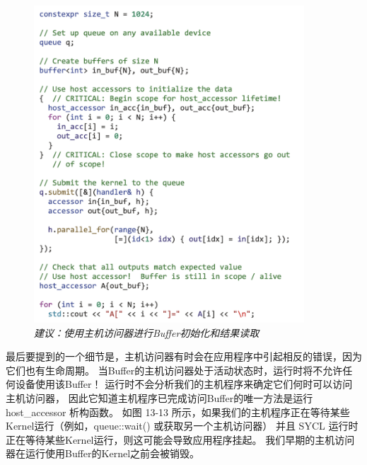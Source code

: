 \begin{figure}[H]
	\centering
	\includegraphics[width=0.9\textwidth]{figs/F13.12.png}
	\caption{\textit{建议：使用主机访问器进行Buffer初始化和结果读取 }}
\end{figure}

最后要提到的一个细节是，主机访问器有时会在应用程序中引起相反的错误，因为它们也有生命周期。 
当Buffer的主机访问器处于活动状态时，运行时将不允许任何设备使用该Buffer！ 
运行时不会分析我们的主机程序来确定它们何时可以访问主机访问器，
因此它知道主机程序已完成访问Buffer的唯一方法是运行 host\_accessor 析构函数。 
如图 13-13 所示，如果我们的主机程序正在等待某些Kernel运行（例如，queue::wait() 或获取另一个主机访问器）
并且 SYCL 运行时正在等待某些Kernel运行，则这可能会导致应用程序挂起。 
我们早期的主机访问器在运行使用Buffer的Kernel之前会被销毁。

